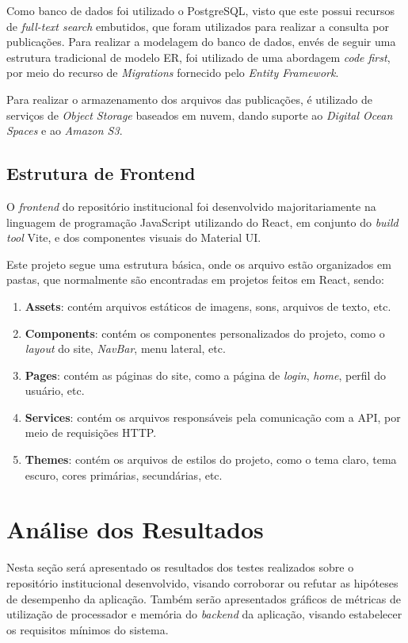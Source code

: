 Como banco de dados foi utilizado o PostgreSQL, visto que este possui recursos de
\emph{full-text search} embutidos, que foram utilizados para realizar a consulta
por publicações. Para realizar a modelagem do banco de dados, envés de seguir
uma estrutura tradicional de modelo ER, foi utilizado de uma abordagem
\emph{code first}, por meio do recurso de \emph{Migrations} fornecido pelo
\emph{Entity Framework}.

Para realizar o armazenamento dos arquivos das publicações, é utilizado de serviços de
\emph{Object Storage} baseados em nuvem, dando suporte ao \emph{Digital Ocean Spaces}
e ao \emph{Amazon S3}.

\subsection{Estrutura de Frontend}

O \emph{frontend} do repositório institucional foi desenvolvido majoritariamente
na linguagem de programação JavaScript utilizando do React, em conjunto do
\emph{build tool} Vite, e dos componentes visuais do Material UI.

Este projeto segue uma estrutura básica, onde os arquivo estão organizados
em pastas, que normalmente são encontradas em projetos feitos em React, sendo:
\begin{enumerate}
    \item \textbf{Assets}: contém arquivos estáticos de imagens, sons,
          arquivos de texto, etc.
    \item \textbf{Components}: contém os componentes personalizados do projeto,
          como o \emph{layout} do site, \emph{NavBar}, menu lateral, etc.
    \item \textbf{Pages}: contém as páginas do site, como a página de \emph{login},
          \emph{home}, perfil do usuário, etc.
    \item \textbf{Services}: contém os arquivos responsáveis pela comunicação
          com a API, por meio de requisições HTTP.
    \item \textbf{Themes}: contém os arquivos de estilos do projeto, como
          o tema claro, tema escuro, cores primárias, secundárias, etc.
\end{enumerate}


\section{Análise dos Resultados}

Nesta seção será apresentado os resultados dos testes realizados
sobre o repositório institucional desenvolvido, visando corroborar ou refutar
as hipóteses de desempenho da aplicação. Também serão apresentados gráficos de
métricas de utilização de processador e memória do \emph{backend} da aplicação,
visando estabelecer os requisitos mínimos do sistema.

